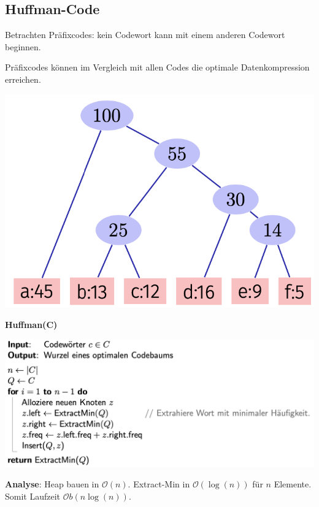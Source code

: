 \begin{sectionbox}
\subsection{Huffman-Code} 
Betrachten Präfixcodes: kein Codewort kann mit einem anderen Codewort beginnen.\par
Präfixcodes können im Vergleich mit allen Codes die optimale Datenkompression erreichen.\par\smallskip
\begin{center}
    \includegraphics[width=0.35 \columnwidth]{img/HuffmanImg.png}
\end{center}\par\smallskip

\textbf{Huffman(C)}
\begin{center}
    \includegraphics[width= \columnwidth]{img/HuffmanAlgo.png}
\end{center}\par\smallskip

\textbf{Analyse}: Heap bauen in $\mathcal{O}(n)$. Extract-Min in $\mathcal{O}(\log (n))$ für $n$ Elemente. Somit Laufzeit $\mathcal{O}b(n \log(n))$.
\end{sectionbox}

